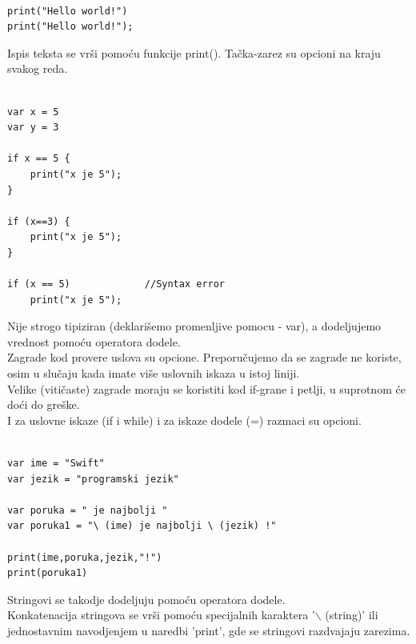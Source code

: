 \documentclass[a4paper]{article}
\begin{document}
\begin{lstlisting}[caption={},frame=single, label=simple]

print("Hello world!")
print("Hello world!");

\end{lstlisting}

Ispis teksta se vrši pomoću funkcije print(). Tačka-zarez su opcioni na kraju svakog reda.\\



\begin{lstlisting}[caption={},frame=single, label=simple]

var x = 5
var y = 3

if x == 5 {
	print("x je 5");
}

if (x==3) {
	print("x je 5");
}

if (x == 5)				//Syntax error
	print("x je 5");

\end{lstlisting}

Nije strogo tipiziran (deklarišemo promenljive pomocu - var), a dodeljujemo vrednost pomoću operatora dodele.\\
Zagrade kod provere uslova su opcione. Preporučujemo da se zagrade ne koriste, osim u slučaju kada imate više uslovnih iskaza u istoj liniji.\\
Velike (vitičaste) zagrade moraju se koristiti kod if-grane i petlji, u suprotnom će doći do greške.\\
I za uslovne iskaze (if i while) i za iskaze dodele (=) razmaci su opcioni.\\



\begin{lstlisting}[caption={},frame=single, label=simple]

var ime = "Swift"
var jezik = "programski jezik"

var poruka = " je najbolji "
var poruka1 = "\ (ime) je najbolji \ (jezik) !" 

print(ime,poruka,jezik,"!")
print(poruka1)

\end{lstlisting}

Stringovi se takodje dodeljuju pomoću operatora dodele.\\
Konkatenacija stringova se vrši pomoću specijalnih karaktera '$\backslash$ (string)' ili jednostavnim navodjenjem u naredbi 'print', gde se stringovi razdvajaju zarezima.\\
\end{document}
